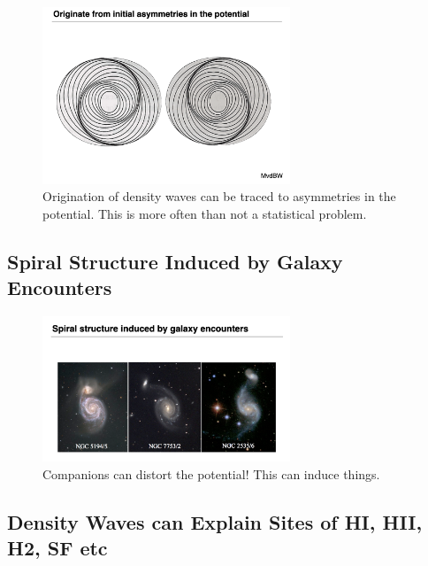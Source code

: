 \documentclass{article}
\begin{document}
\begin{figure}
    \centering
    \includegraphics[width=0.66\textwidth]{figs/Screen Shot 2021-10-27 at 10.31.33 AM.png}
    \caption{Origination of density waves can be traced to asymmetries in the potential. This is more often than not a statistical problem.}
    \label{fig:triaxial_potentaiL_perturbations}
\end{figure}

\subsection{Spiral Structure Induced by Galaxy Encounters}

\begin{figure}
    \centering
    \includegraphics[width=0.66\textwidth]{figs/Screen Shot 2021-10-27 at 10.33.42 AM.png}
    \caption{Companions can distort the potential! This can induce things.}
    \label{fig:arms_induced_by}
\end{figure}

\subsection{Density Waves can Explain Sites of HI, HII, H2, SF etc}
\end{document}
